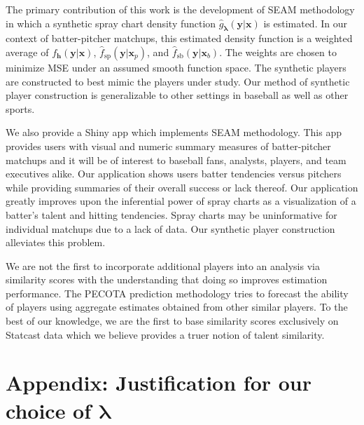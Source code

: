 \documentclass[12pt]{article}
\newcommand{\y}{\textbf{y}}
\newcommand{\x}{\textbf{x}}
\newcommand{\h}{\textbf{h}}
\newcommand{\lambdabf}{\boldsymbol{\lambda}}
\begin{document}
The primary contribution of this work is the development of SEAM methodology in which a synthetic spray chart density function $\hat{g}_{\lambdabf}(\y|\x)$ is estimated. In our context of batter-pitcher matchups, this estimated density function is a weighted average of $f_\h(\y|\x)$, $\hat f_{\text{sp}}(\y|\x_p)$, and $\hat f_{\text{sb}}(\y|\x_b)$. The weights are chosen to minimize MSE under an assumed smooth function space. The synthetic players are constructed to best mimic the players under study. Our method of synthetic player construction is generalizable to other settings in baseball as well as other sports.

We also provide a Shiny app which implements SEAM methodology. This app provides users with visual and numeric summary measures of batter-pitcher matchups and it will be of interest to baseball fans, analysts, players, and team executives alike. Our application shows users batter tendencies versus pitchers while providing summaries of their overall success or lack thereof. Our application greatly improves upon the inferential power of spray charts \citep{pettispray, marchi2019analyzing} as a visualization of a batter's talent and hitting tendencies. Spray charts may be uninformative for individual matchups due to a lack of data. Our synthetic player construction alleviates this problem.

We are not the first to incorporate additional players into an analysis via similarity scores with the understanding that doing so improves estimation performance. The PECOTA prediction methodology \citep{PECOTA} tries to forecast the ability of players using aggregate estimates obtained from other similar players. To the best of our knowledge, we are the first to base similarity scores exclusively on Statcast data which we believe provides a truer notion of talent similarity.  







\section*{Appendix: Justification for our choice of $\lambdabf$}
\end{document}

